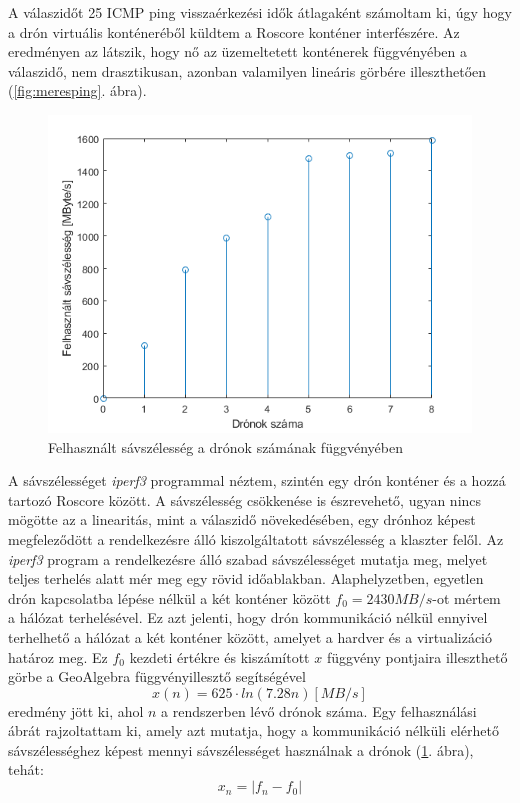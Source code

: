 \noindent
A válaszidőt 25 ICMP ping visszaérkezési idők átlagaként számoltam ki, úgy hogy a drón virtuális konténeréből küldtem a Roscore konténer interfészére. Az eredményen az látszik, hogy nő az üzemeltetett konténerek függvényében a válaszidő, nem drasztikusan, azonban valamilyen lineáris görbére illeszthetően (\ref{fig:meresping}. ábra).  \\

\begin{figure}
	\centering
	\includegraphics{figures/meres_iperf_inv.png}
	\caption{Felhasznált sávszélesség a drónok számának függvényében}
	\label{fig:meresiperf}
\end{figure}

\noindent
A sávszélességet \emph{iperf3} programmal néztem, szintén egy drón konténer és a hozzá tartozó Roscore között. A sávszélesség csökkenése is észrevehető, ugyan nincs mögötte az a linearitás, mint a válaszidő növekedésében, egy drónhoz képest megfeleződött a rendelkezésre álló kiszolgáltatott sávszélesség a klaszter felől. Az \emph{iperf3} program a rendelkezésre álló szabad sávszélességet mutatja meg, melyet teljes terhelés alatt mér meg egy rövid időablakban. Alaphelyzetben, egyetlen drón kapcsolatba lépése nélkül a két konténer között $f_{0}=2430 MB/s$-ot mértem a hálózat terhelésével. Ez azt jelenti, hogy drón kommunikáció nélkül ennyivel terhelhető a hálózat a két konténer között, amelyet a hardver és a virtualizáció határoz meg. Ez $f_0$ kezdeti értékre és kiszámított $x$ függvény pontjaira illeszthető görbe a GeoAlgebra függvényillesztő segítségével \[ x(n) = 625 \cdot ln(7.28n) [MB/s]\] eredmény jött ki, ahol $n$ a rendszerben lévő drónok száma. Egy felhasználási ábrát rajzoltattam ki, amely azt mutatja, hogy a kommunikáció nélküli elérhető sávszélességhez képest mennyi sávszélességet használnak a drónok (\ref{fig:meresiperf}. ábra), tehát: \[x_n = | f_n - f_0 |\]  \\

